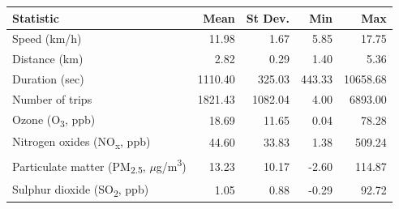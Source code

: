 \begin{tabular}{lrrrr}
\toprule
Statistic & Mean & St Dev. & Min & Max \\
\midrule
Speed (km/h) & 11.98 & 1.67 & 5.85 & 17.75 \\
Distance (km) & 2.82 & 0.29 & 1.40 & 5.36 \\
Duration (sec) & 1110.40 & 325.03 & 443.33 & 10658.68 \\
Number of trips & 1821.43 & 1082.04 & 4.00 & 6893.00 \\
Ozone (O\textsubscript{3}, ppb) & 18.69 & 11.65 & 0.04 & 78.28 \\
Nitrogen oxides (NO\textsubscript{x}, ppb) & 44.60 & 33.83 & 1.38 & 509.24 \\
Particulate matter (PM\textsubscript{2.5}, $\mu$g/m\textsuperscript{3}) & 13.23 & 10.17 & -2.60 & 114.87 \\
Sulphur dioxide (SO\textsubscript{2}, ppb) & 1.05 & 0.88 & -0.29 & 92.72 \\
\bottomrule
\end{tabular}
